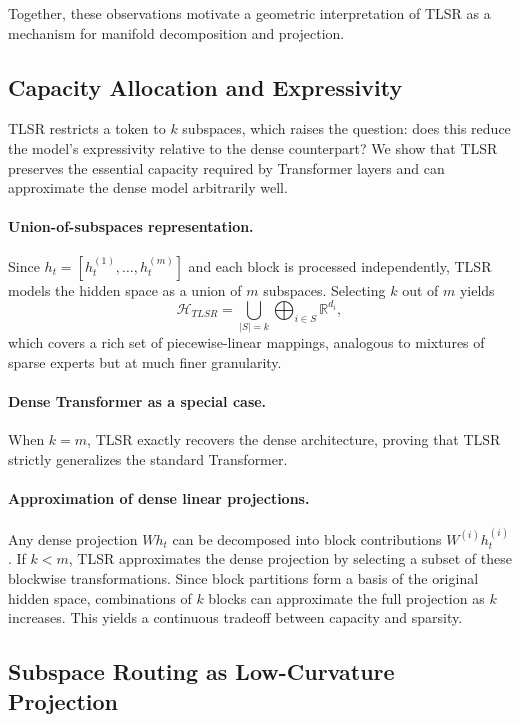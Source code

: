 \documentclass{article}
\theoremstyle{plain}
\theoremstyle{definition}
\theoremstyle{remark}
\begin{document}
Together, these observations motivate a geometric interpretation of TLSR
as a mechanism for manifold decomposition and projection.

\subsection{Capacity Allocation and Expressivity}

TLSR restricts a token to $k$ subspaces, which raises the question:
does this reduce the model’s expressivity relative to the dense counterpart?
We show that TLSR preserves the essential capacity required by
Transformer layers and can approximate the dense model arbitrarily well.

\paragraph{Union-of-subspaces representation.}
Since $h_t = [h_t^{(1)},\dots,h_t^{(m)}]$ and each block is processed independently,
TLSR models the hidden space as a union of $m$ subspaces.
Selecting $k$ out of $m$ yields
\[
\mathcal{H}_{TLSR}
= \bigcup_{|S|=k} \bigoplus_{i\in S} \mathbb{R}^{d_i},
\]
which covers a rich set of piecewise-linear mappings,
analogous to mixtures of sparse experts but at much finer granularity.

\paragraph{Dense Transformer as a special case.}
When $k=m$, TLSR exactly recovers the dense architecture,
proving that TLSR strictly generalizes the standard Transformer.

\paragraph{Approximation of dense linear projections.}
Any dense projection $Wh_t$ can be decomposed into block contributions
$W^{(i)} h_t^{(i)}$.
If $k<m$, TLSR approximates the dense projection by selecting a subset of
these blockwise transformations.
Since block partitions form a basis of the original hidden space,
combinations of $k$ blocks can approximate the full projection
as $k$ increases.
This yields a continuous tradeoff between capacity and sparsity.

\subsection{Subspace Routing as Low-Curvature Projection}
\end{document}
